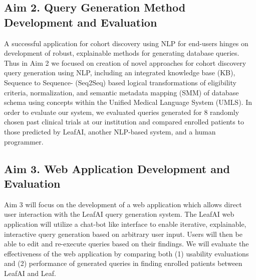 \documentclass[../main.tex]{subfiles}
\begin{document}
\subsection{Aim 2. Query Generation Method Development and Evaluation}
A successful application for cohort discovery using NLP for end-users hinges on development of robust, explainable methods for generating database queries. Thus in Aim 2 we focused on creation of novel approaches for cohort discovery query generation using NLP, including an integrated knowledge base (KB), Sequence to Sequence- (Seq2Seq) based logical transformations of eligibility criteria, normalization, and semantic metadata mapping (SMM) of database schema using concepts within the Unified Medical Language System (UMLS). In order to evaluate our system, we evaluated queries generated for 8 randomly chosen past clinical trials at our institution and compared enrolled patients to those predicted by LeafAI, another NLP-based system, and a human programmer.

\subsection{Aim 3. Web Application Development and Evaluation}
Aim 3 will focus on the development of a web application which allows direct user interaction with the LeafAI query generation system. The LeafAI web application will utilize a chat-bot like interface to enable iterative, explainable, interactive query generation based on arbitrary user input. Users will then be able to edit and re-execute queries based on their findings. We will evaluate the effectiveness of the web application by comparing both (1) usability evaluations and (2) performance of generated queries in finding enrolled patients between LeafAI and Leaf.

\newpage
\end{document}
